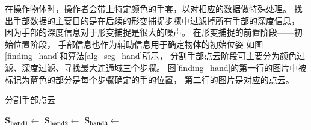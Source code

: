 在操作物体时，操作者会带上特定颜色的手套，以对相应的数据做特殊处理。
找出手部数据的主要目的是在后续的形变捕捉步骤中过滤掉所有手部的深度信息，
因为手部的深度信息对于形变捕捉是很大的噪声。
在形变捕捉的前置阶段——初始位置阶段，
手部信息也作为辅助信息用于确定物体的初始位姿
如图\ref{finding_hand}和算法\ref{alg_seg_hand}所示，
分割手部点云阶段可主要分为颜色过滤、深度过滤、寻找最大连通域三个步骤。
图\ref{finding_hand}的第一行的图片中被标记为蓝色的部分是每个步骤确定的手的位置，
第二行的图片是对应的点云。
\begin{algorithm}
    \caption{分割手部点云}
    \label{alg_seg_hand}
    \begin{algorithmic}[1]
            \State $\bm{S_{hand1}} \gets$ 
            \State $\bm{S_{hand2}} \gets$ 
            \State $\bm{S_{hand3}} \gets$ 
        \EndProcedure
    \end{algorithmic}
\end{algorithm}

